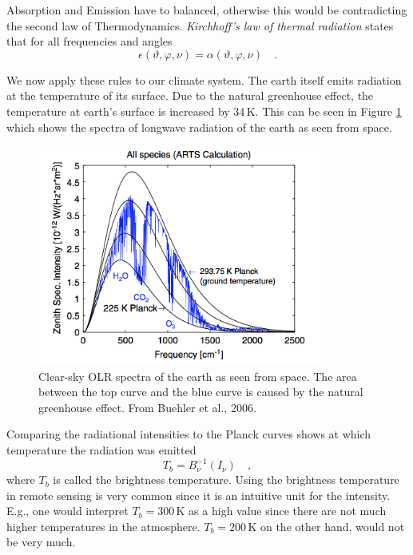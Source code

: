Absorption and Emission have to balanced, otherwise this would be
contradicting the second law of Thermodynamics. \textit{Kirchhoff's
  law of thermal radiation} states that for all frequencies and angles
\begin{equation}
\epsilon(\vartheta,\varphi,\nu) = \alpha(\vartheta,\varphi,\nu) \quad .
\end{equation}

We now apply these rules to our climate system. The earth itself emits
radiation at the temperature of its surface. Due to the natural
greenhouse effect, the temperature at earth's surface is increased by
34\,K. This can be seen in Figure \ref{Buehler_et_al_OLR_spectra}
which shows the spectra of longwave radiation of the earth as seen
from space.

 \begin{figure}
\begin{center}
\includegraphics[width=0.85\textwidth]{figures/Buehler_et_al_OLR_spectra}
\caption{Clear-sky OLR spectra of the earth as seen from space. The area between the top curve and the blue curve is caused by the natural greenhouse effect. From Buehler et al., 2006.}
\label{Buehler_et_al_OLR_spectra}
\end{center}
\end{figure}

Comparing the radiational intensities to the Planck curves shows at
which temperature the radiation was emitted
\begin{equation}
T_b = B^{-1}_{\nu}(I_{\nu}) \quad ,
\end{equation}
where $T_b$ is called the brightness temperature. Using the brightness
temperature in remote sensing is very common since it is an intuitive
unit for the intensity. E.g., one would interpret $T_b = 300$\,K as a
high value since there are not much higher temperatures in the
atmosphere. $T_b = 200$\,K on the other hand, would not be very much.
 


